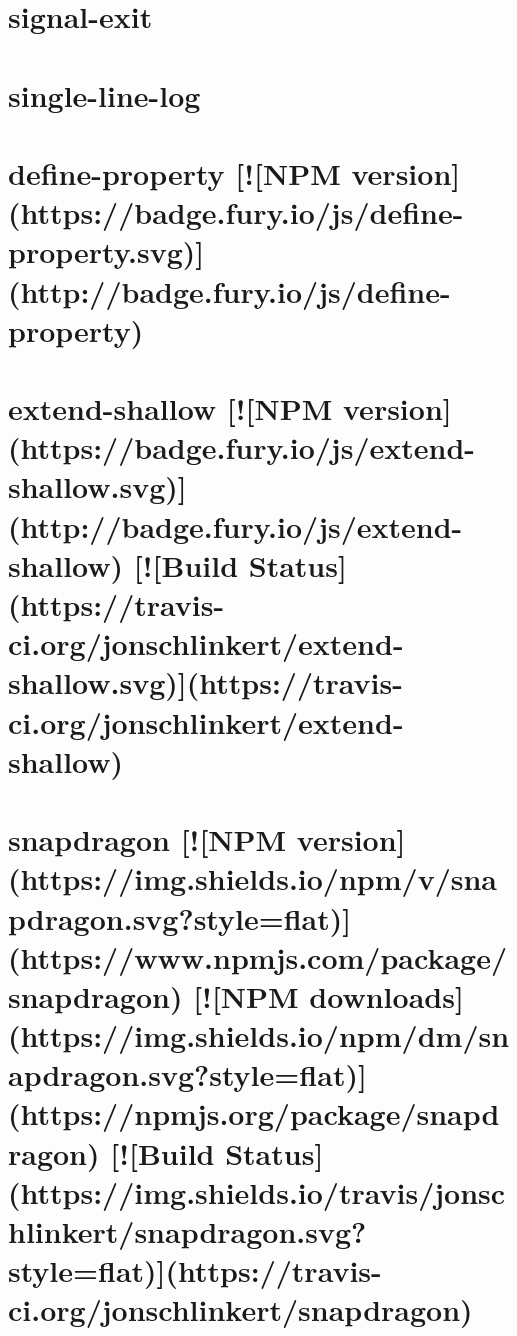 \documentclass[twoside]{book}
\newcommand{\+}{\discretionary{\mbox{\scriptsize$\hookleftarrow$}}{}{}}
\begin{document}
\chapter{signal-\/exit}
\label{md_dsmacc_vis_degree_node_modules_signal-exit_README}

\chapter{single-\/line-\/log}
\label{md_dsmacc_vis_degree_node_modules_single-line-log_README}

\chapter{define-\/property \mbox{[}!\mbox{[}N\+PM version\mbox{]}(https\+://badge.fury.\+io/js/define-\/property.svg)\mbox{]}(http\+://badge.fury.\+io/js/define-\/property)}
\label{md_dsmacc_vis_degree_node_modules_snapdragon_node_modules_define-property_README}

\chapter{extend-\/shallow \mbox{[}!\mbox{[}N\+PM version\mbox{]}(https\+://badge.fury.\+io/js/extend-\/shallow.svg)\mbox{]}(http\+://badge.fury.\+io/js/extend-\/shallow) \mbox{[}!\mbox{[}Build Status\mbox{]}(https\+://travis-\/ci.org/jonschlinkert/extend-\/shallow.svg)\mbox{]}(https\+://travis-\/ci.org/jonschlinkert/extend-\/shallow)}
\label{md_dsmacc_vis_degree_node_modules_snapdragon_node_modules_extend-shallow_README}

\chapter{snapdragon \mbox{[}!\mbox{[}N\+PM version\mbox{]}(https\+://img.shields.\+io/npm/v/snapdragon.svg?style=flat)\mbox{]}(https\+://www.npmjs.\+com/package/snapdragon) \mbox{[}!\mbox{[}N\+PM downloads\mbox{]}(https\+://img.shields.\+io/npm/dm/snapdragon.svg?style=flat)\mbox{]}(https\+://npmjs.org/package/snapdragon) \mbox{[}!\mbox{[}Build Status\mbox{]}(https\+://img.shields.\+io/travis/jonschlinkert/snapdragon.svg?style=flat)\mbox{]}(https\+://travis-\/ci.org/jonschlinkert/snapdragon)}
\label{md_dsmacc_vis_degree_node_modules_snapdragon_README}

\end{document}
